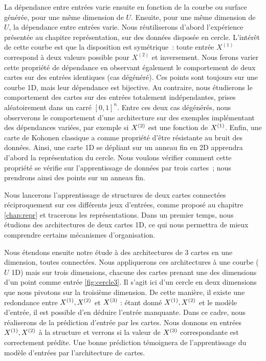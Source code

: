 \documentclass[../main]{subfiles}
\begin{document}
La dépendance entre entrées varie ensuite en fonction de la courbe ou surface générée, pour une même dimension de $U$.
Ensuite, pour une même dimension de $U$, la dépendance entre entrées varie.
Nous réutiliserons d'abord l'expérience présentée au chapitre représentation, sur des données disposée en cercle. L'intérêt de cette courbe est que la disposition est symétrique~: toute entrée $X^{(1)}$ correspond à deux valeurs possible pour $X^{(2)}$ et inversement.
Nous ferons varier cette propriété de dépendance en observant également le comportement de deux cartes sur des entrées identiques (cas dégénéré). Ces points sont toujours sur une courbe 1D, mais leur dépendance est bijective.
Au contraire, nous étudierons le comportement des cartes sur des entrées totalement indépendantes, prises aléatoirement dans un carré $[0,1]^n$.
Entre ces deux cas dégénérés, nous observerons le comportement d'une architecture sur des exemples implémentant des dépendances variées, par exemple si $X^{({2})}$ est une fonction de $X^{({1})}$.
Enfin, une carte de Kohonen classique a comme propriété d'être résistante au bruit des données. Ainsi, une carte 1D se dépliant sur un anneau fin en 2D apprendra d'abord la représentation du cercle. Nous voulons vérifier comment cette propriété se vérifie sur l'apprentissage de données par trois cartes~; nous prendrons ainsi des points sur un anneau fin.

Nous lancerons l'apprentissage de structures de deux cartes connectées réciproquement sur ces différents jeux d'entrées, comme proposé au chapitre \ref{chap:repr} et tracerons les représentations. 
Dans un premier temps, nous étudions des architectures de deux cartes 1D, ce qui nous permettra de mieux comprendre certains mécanismes d'organisation.

Nous étendons ensuite notre étude à des architectures de 3 cartes en une dimension, toutes connectées. Nous appliquerons ces architectures à une courbe ($U$ 1D) mais sur trois dimensions, chacune des cartes prenant une des dimensions d'un point comme entrée \ref{fig:cercle3}. Il s'agit ici d'un cercle en deux dimensions que nous pivotons sur la troisième dimension. De cette manière, il existe une redondance entre $X^{({1})}, X^{({2})}$ et $X^{({3})}$ : étant donné $X^{({1})}, X^{({2})}$ et le modèle d'entrée, il est possible d'en déduire l'entrée manquante.
Dans ce cadre, nous réaliserons de la prédiction d'entrée par les cartes. Nous donnons en entrées $X^{({1})}, X^{({2})}$ à la structure et verrons si la valeur de $X^{({3})}$ correspondante est correctement prédite. Une bonne prédiction témoignera de l'apprentissage du modèle d'entrées par l'architecture de cartes.
\end{document}
